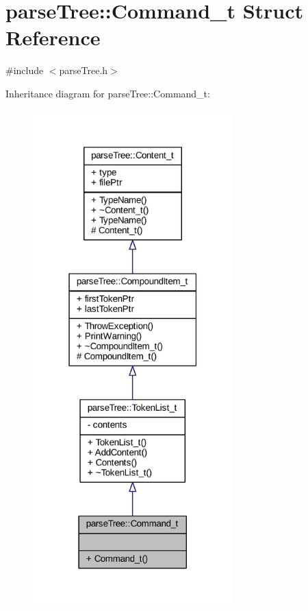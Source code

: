\hypertarget{structparse_tree_1_1_command__t}{}\section{parse\+Tree\+:\+:Command\+\_\+t Struct Reference}
\label{structparse_tree_1_1_command__t}


{\ttfamily \#include $<$parse\+Tree.\+h$>$}



Inheritance diagram for parse\+Tree\+:\+:Command\+\_\+t\+:
\nopagebreak
\begin{figure}[H]
\begin{center}
\leavevmode
\includegraphics[width=219pt]{structparse_tree_1_1_command__t__inherit__graph}
\end{center}
\end{figure}


